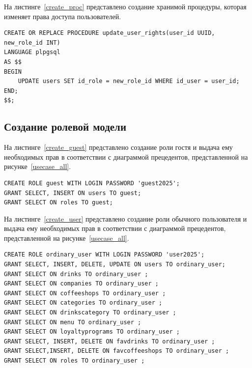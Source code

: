 На листинге~\ref{create_proc} представлено создание хранимой процедуры, которая изменяет права доступа пользователей.
\begin{center}
	\captionsetup{justification=raggedright,singlelinecheck=off}
	\begin{lstlisting}[label=create_proc,caption={Создание хранимой процедуры, которая изменяет права доступа пользователей.}]
CREATE OR REPLACE PROCEDURE update_user_rights(user_id UUID, new_role_id INT)
LANGUAGE plpgsql
AS $$
BEGIN
	UPDATE users SET id_role = new_role_id WHERE id_user = user_id;
END;
$$;
	\end{lstlisting}
\end{center}

\newpage
\subsection{Создание ролевой модели}
На листинге~\ref{create_guest} представлено создание
роли гостя и выдача ему необходимых прав в соответствии с диаграммой прецедентов, представленной на рисунке~\ref{usecase_all}.
\begin{center}
	\captionsetup{justification=raggedright,singlelinecheck=off}
	\begin{lstlisting}[label=create_guest,caption={Создание роли гостя}]
CREATE ROLE guest WITH LOGIN PASSWORD 'guest2025';
GRANT SELECT, INSERT ON users TO guest;
GRANT SELECT ON roles TO guest;
	\end{lstlisting}
\end{center}

На листинге~\ref{create_user} представлено создание
роли обычного пользователя и выдача ему необходимых прав в соответствии с диаграммой прецедентов, представленной на рисунке~\ref{usecase_all}.
\begin{center}
	\captionsetup{justification=raggedright,singlelinecheck=off}
	\begin{lstlisting}[label=create_user,caption={Создание роли обычного пользователя}]
CREATE ROLE ordinary_user WITH LOGIN PASSWORD 'user2025';
GRANT SELECT, INSERT, DELETE, UPDATE ON users TO ordinary_user;
GRANT SELECT ON drinks TO ordinary_user ;
GRANT SELECT ON companies TO ordinary_user ;
GRANT SELECT ON coffeeshops TO ordinary_user ;
GRANT SELECT ON categories TO ordinary_user ;
GRANT SELECT ON drinkscategory TO ordinary_user ;
GRANT SELECT ON menu TO ordinary_user ;
GRANT SELECT ON loyaltyprograms TO ordinary_user ;
GRANT SELECT, INSERT, DELETE ON favdrinks TO ordinary_user ;
GRANT SELECT,INSERT, DELETE ON favcoffeeshops TO ordinary_user ;
GRANT SELECT ON roles TO ordinary_user ;
	\end{lstlisting}
\end{center}


